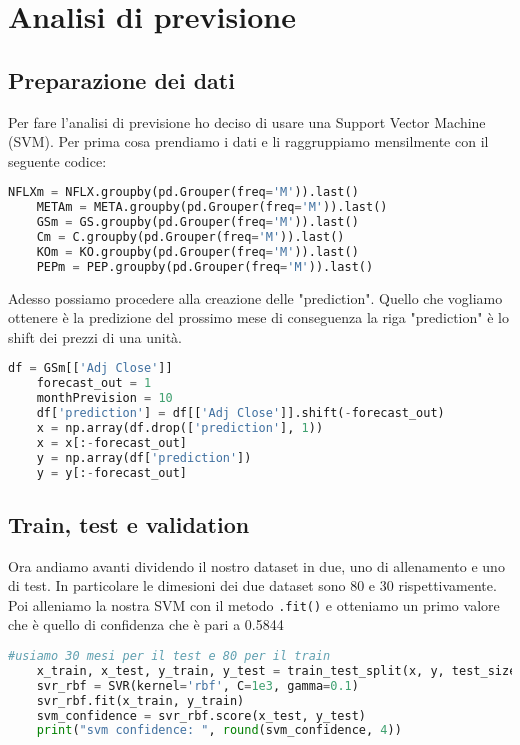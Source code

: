 \documentclass{report}
\begin{document}
\chapter{Analisi di previsione}
\section{Preparazione dei dati}
Per fare l'analisi di previsione ho deciso di usare una Support Vector Machine (SVM). Per prima cosa prendiamo i dati e li raggruppiamo mensilmente con il seguente codice:
\begin{lstlisting}[language=python]
    NFLXm = NFLX.groupby(pd.Grouper(freq='M')).last()
    METAm = META.groupby(pd.Grouper(freq='M')).last()
    GSm = GS.groupby(pd.Grouper(freq='M')).last()
    Cm = C.groupby(pd.Grouper(freq='M')).last()
    KOm = KO.groupby(pd.Grouper(freq='M')).last()
    PEPm = PEP.groupby(pd.Grouper(freq='M')).last()
\end{lstlisting}
Adesso possiamo procedere alla creazione delle "prediction". Quello che vogliamo ottenere è la predizione del prossimo mese di conseguenza la riga "prediction" è lo shift dei prezzi di una unità.

\begin{lstlisting}[language=python]
    df = GSm[['Adj Close']]
    forecast_out = 1
    monthPrevision = 10
    df['prediction'] = df[['Adj Close']].shift(-forecast_out)
    x = np.array(df.drop(['prediction'], 1))
    x = x[:-forecast_out]
    y = np.array(df['prediction'])
    y = y[:-forecast_out]
\end{lstlisting}
\section{Train, test e validation}
Ora andiamo avanti dividendo il nostro dataset in due, uno di allenamento e uno di test. In particolare le dimesioni dei due dataset sono 80 e 30 rispettivamente. Poi alleniamo la nostra SVM con il metodo \lstinline{.fit()} e otteniamo un primo valore che è quello di confidenza che è pari a \num{0.5844}

\begin{lstlisting}[language=python]
    #usiamo 30 mesi per il test e 80 per il train
    x_train, x_test, y_train, y_test = train_test_split(x, y, test_size=30, train_size=80)
    svr_rbf = SVR(kernel='rbf', C=1e3, gamma=0.1)
    svr_rbf.fit(x_train, y_train)
    svm_confidence = svr_rbf.score(x_test, y_test)
    print("svm confidence: ", round(svm_confidence, 4))
\end{lstlisting}
\end{document}
